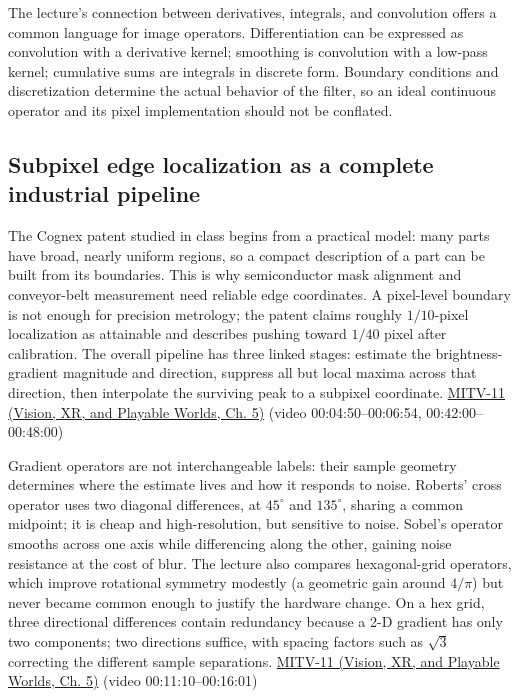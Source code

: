 The lecture's connection between derivatives, integrals, and convolution offers a common language for image operators. Differentiation can be expressed as convolution with a derivative kernel; smoothing is convolution with a low-pass kernel; cumulative sums are integrals in discrete form. Boundary conditions and discretization determine the actual behavior of the filter, so an ideal continuous operator and its pixel implementation should not be conflated.

\subsection{Subpixel edge localization as a complete industrial pipeline}\label{04-visual-computing-ii-ch030-subpixel-edge-localization-as-a-complete-industrial-pipeline}

\hypertarget{04-visual-computing-ii-ch030-subpixel-edge-localization-as-a-complete-industrial-pipeline}{}

The Cognex patent studied in class begins from a practical model: many parts have broad, nearly uniform regions, so a compact description of a part can be built from its boundaries. This is why semiconductor mask alignment and conveyor-belt measurement need reliable edge coordinates. A pixel-level boundary is not enough for precision metrology; the patent claims roughly \(1/10\)-pixel localization as attainable and describes pushing toward \(1/40\) pixel after calibration. The overall pipeline has three linked stages: estimate the brightness-gradient magnitude and direction, suppress all but local maxima across that direction, then interpolate the surviving peak to a subpixel coordinate. \href{../07-Vision-XR-and-Playable-Worlds/main.pdf\#nameddest=04-visual-computing-ii-ch036-mitv-11---edge-detection-subpixel-position-cordic-line-detection-us-6408109}{MITV-11 (Vision, XR, and Playable Worlds, Ch. 5)} (video 00:04:50--00:06:54, 00:42:00--00:48:00)

Gradient operators are not interchangeable labels: their sample geometry determines where the estimate lives and how it responds to noise. Roberts' cross operator uses two diagonal differences, at \(45^\circ\) and \(135^\circ\), sharing a common midpoint; it is cheap and high-resolution, but sensitive to noise. Sobel's operator smooths across one axis while differencing along the other, gaining noise resistance at the cost of blur. The lecture also compares hexagonal-grid operators, which improve rotational symmetry modestly (a geometric gain around \(4/\pi\)) but never became common enough to justify the hardware change. On a hex grid, three directional differences contain redundancy because a 2-D gradient has only two components; two directions suffice, with spacing factors such as \(\sqrt3\) correcting the different sample separations. \href{../07-Vision-XR-and-Playable-Worlds/main.pdf\#nameddest=04-visual-computing-ii-ch036-mitv-11---edge-detection-subpixel-position-cordic-line-detection-us-6408109}{MITV-11 (Vision, XR, and Playable Worlds, Ch. 5)} (video 00:11:10--00:16:01)

